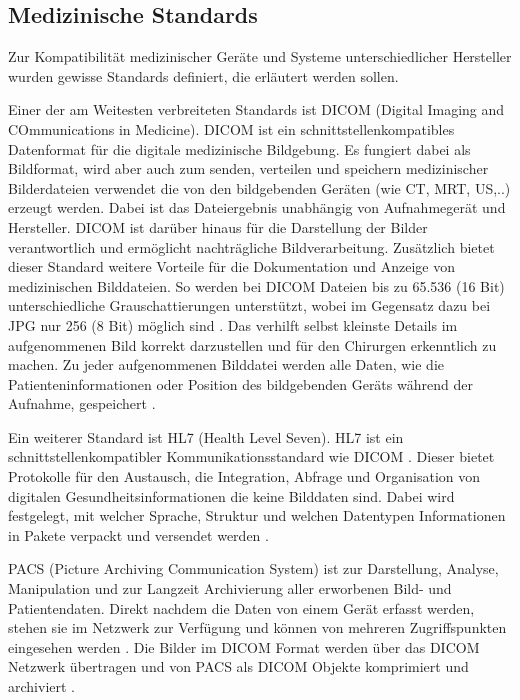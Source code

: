\subsection{Medizinische Standards}

Zur Kompatibilität medizinischer Geräte und Systeme unterschiedlicher Hersteller wurden gewisse Standards definiert, die erläutert werden sollen.

Einer der am Weitesten verbreiteten Standards ist DICOM (Digital Imaging and COmmunications in Medicine). DICOM ist ein schnittstellenkompatibles Datenformat für die digitale medizinische Bildgebung. Es fungiert dabei als Bildformat, wird aber auch zum senden, verteilen und speichern medizinischer Bilderdateien verwendet die von den bildgebenden Geräten (wie CT, MRT, US,..) erzeugt werden. Dabei ist das Dateiergebnis unabhängig von Aufnahmegerät und Hersteller. DICOM ist darüber hinaus für die Darstellung der Bilder verantwortlich und ermöglicht nachträgliche Bildverarbeitung. Zusätzlich bietet dieser Standard weitere Vorteile für die Dokumentation und Anzeige von medizinischen Bilddateien. So werden bei DICOM Dateien bis zu 65.536 (16 Bit) unterschiedliche Grauschattierungen unterstützt, wobei im Gegensatz dazu bei JPG nur 256 (8 Bit) möglich sind \cite{DICOM}. Das verhilft selbst kleinste Details im aufgenommenen Bild korrekt darzustellen und für den Chirurgen erkenntlich zu machen. Zu jeder aufgenommenen Bilddatei werden alle Daten, wie die Patienteninformationen oder Position des bildgebenden Geräts während der Aufnahme, gespeichert \cite{DICOM}.

Ein weiterer Standard ist HL7 (Health Level Seven). HL7 ist ein schnittstellenkompatibler Kommunikationsstandard wie DICOM \cite{DerDigitaleOperationssaal}. Dieser bietet Protokolle für den Austausch, die Integration, Abfrage und Organisation von digitalen Gesundheitsinformationen die keine Bilddaten sind. Dabei wird festgelegt, mit welcher Sprache, Struktur und welchen Datentypen Informationen in Pakete verpackt und versendet werden \cite{HL7}.

PACS (Picture Archiving Communication System) ist zur Darstellung, Analyse, Manipulation und zur Langzeit Archivierung aller erworbenen Bild- und Patientendaten. Direkt nachdem die Daten von einem Gerät erfasst werden, stehen sie im Netzwerk zur Verfügung und können von mehreren Zugriffspunkten eingesehen werden \cite{PACS}.
Die Bilder im DICOM Format werden über das DICOM Netzwerk übertragen und von PACS als DICOM Objekte komprimiert und archiviert \cite{DICOM}.

